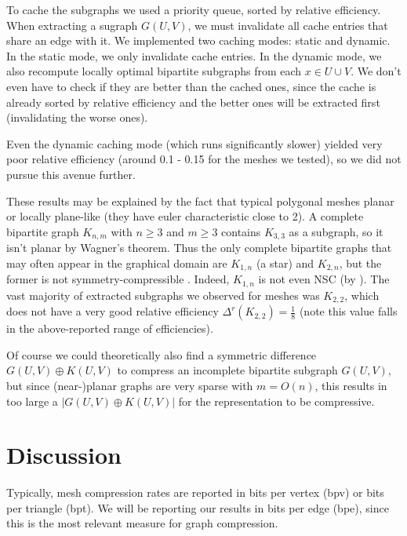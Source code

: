 \documentclass{egpubl}
\begin{document}
To cache the subgraphs we used a priority queue, sorted by relative efficiency. When extracting a sugraph $G(U,V)$, we must invalidate all cache entries that share an edge with it. 
We implemented two caching modes: static and dynamic. In the static mode, we only invalidate cache entries. In the dynamic mode, we also recompute locally optimal bipartite subgraphs from each $x \in U \cup V$. We don't even have to check if they are better than the cached ones, since the cache is already sorted by relative efficiency and the better ones will be extracted first (invalidating the worse ones).

Even the dynamic caching mode (which runs significantly slower) yielded very poor relative efficiency (around 0.1 - 0.15 for the meshes we tested), so we did not pursue this avenue further.

These results may be explained by the fact that typical polygonal meshes planar or locally plane-like (they have euler characteristic close to 2). A complete bipartite graph $K_{n,m}$ with $n \geq 3$ and $m \geq 3$ contains $K_{3,3}$ as a subgraph, so it isn't planar by Wagner's theorem. Thus the only complete bipartite graphs that may often appear in the graphical domain are $K_{1,n}$ (a star) and $K_{2,n}$, but the former%
is not symmetry-compressible \cite[Theorem 2]{cibej2021automorphisms}. Indeed, $K_{1,n}$ is not even NSC (by \cite[Theorem 6]{cibej2021automorphisms}).
The vast majority of extracted subgraphs we observed for meshes was $K_{2,2}$, which does not have a very good relative efficiency $\Delta^r(K_{2,2}) = \frac{1}{8}$ (note this value falls in the above-reported range of efficiencies).

Of course we could theoretically also find a symmetric difference $G(U,V) \oplus K(U,V)$ to compress an incomplete bipartite subgraph $G(U,V)$, but since (near-)planar graphs are very sparse with $m = O(n)$, this results in too large a $|G(U,V) \oplus K(U,V)|$ for the representation to be compressive. %



\section{Discussion}


Typically, mesh compression rates are reported in bits per vertex (bpv) or bits per triangle (bpt). We will be reporting our results in bits per edge (bpe), since this is the most relevant measure for graph compression.
\end{document}
